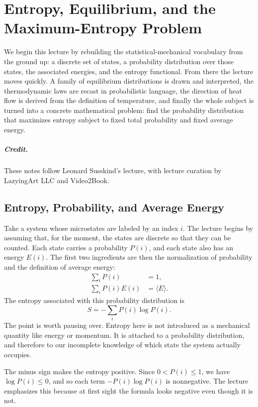 \chapter{Entropy, Equilibrium, and the Maximum-Entropy Problem}

We begin this lecture by rebuilding the statistical-mechanical vocabulary from the ground up: a discrete set of states, a probability distribution over those states, the associated energies, and the entropy functional. From there the lecture moves quickly. A family of equilibrium distributions is drawn and interpreted, the thermodynamic laws are recast in probabilistic language, the direction of heat flow is derived from the definition of temperature, and finally the whole subject is turned into a concrete mathematical problem: find the probability distribution that maximizes entropy subject to fixed total probability and fixed average energy.

\paragraph{Credit.} These notes follow Leonard Susskind's lecture, with lecture curation by LazyingArt LLC and Video2Book.

\section{Entropy, Probability, and Average Energy}

Take a system whose microstates are labeled by an index \(i\). The lecture begins by assuming that, for the moment, the states are discrete so that they can be counted. Each state carries a probability \(P(i)\), and each state also has an energy \(E(i)\). The first two ingredients are then the normalization of probability and the definition of average energy:
\begin{align}
\sum_i P(i) &= 1, \\
\sum_i P(i)E(i) &= \langle E\rangle .
\end{align}
The entropy associated with this probability distribution is
\begin{equation}
S=-\sum_i P(i)\log P(i).
\end{equation}
The point is worth pausing over. Entropy here is not introduced as a mechanical quantity like energy or momentum. It is attached to a probability distribution, and therefore to our incomplete knowledge of which state the system actually occupies.

The minus sign makes the entropy positive. Since \(0<P(i)\le 1\), we have \(\log P(i)\le 0\), and so each term \(-P(i)\log P(i)\) is nonnegative. The lecture emphasizes this because at first sight the formula looks negative even though it is not.

